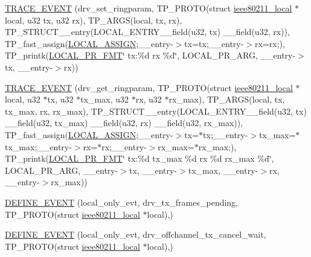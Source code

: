 \begin{DoxyCompactItemize}
\item 
\hyperlink{driver-trace_8h_ae0398765985cff2bbe819fb63d8a165a}{T\-R\-A\-C\-E\-\_\-\-E\-V\-E\-N\-T} (drv\-\_\-set\-\_\-ringparam, T\-P\-\_\-\-P\-R\-O\-T\-O(struct \hyperlink{structieee80211__local}{ieee80211\-\_\-local} $\ast$local, u32 tx, u32 rx), T\-P\-\_\-\-A\-R\-G\-S(local, tx, rx), T\-P\-\_\-\-S\-T\-R\-U\-C\-T\-\_\-\-\_\-entry(L\-O\-C\-A\-L\-\_\-\-E\-N\-T\-R\-Y\-\_\-\-\_\-field(u32, tx) \-\_\-\-\_\-field(u32, rx)), T\-P\-\_\-fast\-\_\-assign(\hyperlink{driver-trace_8h_ab19d9141887ea92ef9640df06a51e0a1}{L\-O\-C\-A\-L\-\_\-\-A\-S\-S\-I\-G\-N};\-\_\-\-\_\-entry-\/$>$tx=tx;\-\_\-\-\_\-entry-\/$>$rx=rx;), T\-P\-\_\-printk(\hyperlink{driver-trace_8h_a09833af423135e21ffe99a59ae088cf1}{L\-O\-C\-A\-L\-\_\-\-P\-R\-\_\-\-F\-M\-T}\char`\"{} tx\-:\%d rx \%d\char`\"{}, L\-O\-C\-A\-L\-\_\-\-P\-R\-\_\-\-A\-R\-G, \-\_\-\-\_\-entry-\/$>$tx, \-\_\-\-\_\-entry-\/$>$rx))
\item 
\hyperlink{driver-trace_8h_a294dca820b93f64b716823759cfbcc83}{T\-R\-A\-C\-E\-\_\-\-E\-V\-E\-N\-T} (drv\-\_\-get\-\_\-ringparam, T\-P\-\_\-\-P\-R\-O\-T\-O(struct \hyperlink{structieee80211__local}{ieee80211\-\_\-local} $\ast$local, u32 $\ast$tx, u32 $\ast$tx\-\_\-max, u32 $\ast$rx, u32 $\ast$rx\-\_\-max), T\-P\-\_\-\-A\-R\-G\-S(local, tx, tx\-\_\-max, rx, rx\-\_\-max), T\-P\-\_\-\-S\-T\-R\-U\-C\-T\-\_\-\-\_\-entry(L\-O\-C\-A\-L\-\_\-\-E\-N\-T\-R\-Y\-\_\-\-\_\-field(u32, tx) \-\_\-\-\_\-field(u32, tx\-\_\-max) \-\_\-\-\_\-field(u32, rx) \-\_\-\-\_\-field(u32, rx\-\_\-max)), T\-P\-\_\-fast\-\_\-assign(\hyperlink{driver-trace_8h_ab19d9141887ea92ef9640df06a51e0a1}{L\-O\-C\-A\-L\-\_\-\-A\-S\-S\-I\-G\-N};\-\_\-\-\_\-entry-\/$>$tx=$\ast$tx;\-\_\-\-\_\-entry-\/$>$tx\-\_\-max=$\ast$tx\-\_\-max;\-\_\-\-\_\-entry-\/$>$rx=$\ast$rx;\-\_\-\-\_\-entry-\/$>$rx\-\_\-max=$\ast$rx\-\_\-max;), T\-P\-\_\-printk(\hyperlink{driver-trace_8h_a09833af423135e21ffe99a59ae088cf1}{L\-O\-C\-A\-L\-\_\-\-P\-R\-\_\-\-F\-M\-T}\char`\"{} tx\-:\%d tx\-\_\-max \%d rx \%d rx\-\_\-max \%d\char`\"{}, L\-O\-C\-A\-L\-\_\-\-P\-R\-\_\-\-A\-R\-G, \-\_\-\-\_\-entry-\/$>$tx, \-\_\-\-\_\-entry-\/$>$tx\-\_\-max, \-\_\-\-\_\-entry-\/$>$rx, \-\_\-\-\_\-entry-\/$>$rx\-\_\-max))
\item 
\hyperlink{driver-trace_8h_a7fca84363a5c6eb9c583c0e58d705297}{D\-E\-F\-I\-N\-E\-\_\-\-E\-V\-E\-N\-T} (local\-\_\-only\-\_\-evt, drv\-\_\-tx\-\_\-frames\-\_\-pending, T\-P\-\_\-\-P\-R\-O\-T\-O(struct \hyperlink{structieee80211__local}{ieee80211\-\_\-local} $\ast$local),)
\item 
\hyperlink{driver-trace_8h_a4db53223cf380ec47370ea511f75ccc5}{D\-E\-F\-I\-N\-E\-\_\-\-E\-V\-E\-N\-T} (local\-\_\-only\-\_\-evt, drv\-\_\-offchannel\-\_\-tx\-\_\-cancel\-\_\-wait, T\-P\-\_\-\-P\-R\-O\-T\-O(struct \hyperlink{structieee80211__local}{ieee80211\-\_\-local} $\ast$local),)

\end{DoxyCompactItemize}
